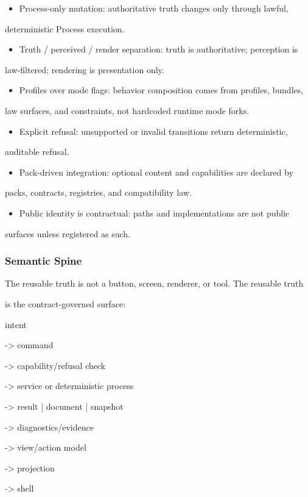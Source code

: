 \documentclass[9pt,a4paper,openany]{book}
\newcommand{\vonecode}[1]{\par\smallskip\noindent\begingroup\setlength{\fboxsep}{7pt}\colorbox{DomCodeBg}{\parbox{0.94\linewidth}{\footnotesize\ttfamily #1}}\endgroup\par\smallskip}
\begin{document}
\begin{itemize}
\item Process-\allowbreak{}only mutation: authoritative truth changes only through lawful,
\end{itemize}
deterministic Process execution.\allowbreak{}

\begin{itemize}
\item Truth /\allowbreak{} perceived /\allowbreak{} render separation: truth is authoritative; perception is
\end{itemize}
law-\allowbreak{}filtered; rendering is presentation only.\allowbreak{}

\begin{itemize}
\item Profiles over mode flags: behavior composition comes from profiles, bundles,
\end{itemize}
law surfaces, and constraints, not hardcoded runtime mode forks.\allowbreak{}

\begin{itemize}
\item Explicit refusal: unsupported or invalid transitions return deterministic,
\end{itemize}
auditable refusal.\allowbreak{}

\begin{itemize}
\item Pack-\allowbreak{}driven integration: optional content and capabilities are declared by
\end{itemize}
packs, contracts, registries, and compatibility law.\allowbreak{}

\begin{itemize}
\item Public identity is contractual: paths and implementations are not public
\end{itemize}
surfaces unless registered as such.\allowbreak{}


\subsubsection{Semantic Spine}

The reusable truth is not a button, screen, renderer, or tool.\allowbreak{} The reusable truth

is the contract-\allowbreak{}governed surface:


\vonecode{intent\par
-\allowbreak{}> command\par
-\allowbreak{}> capability/\allowbreak{}refusal check\par
-\allowbreak{}> service or deterministic process\par
-\allowbreak{}> result | document | snapshot\par
-\allowbreak{}> diagnostics/\allowbreak{}evidence\par
-\allowbreak{}> view/\allowbreak{}action model\par
-\allowbreak{}> projection\par
-\allowbreak{}> shell\par}
\end{document}
